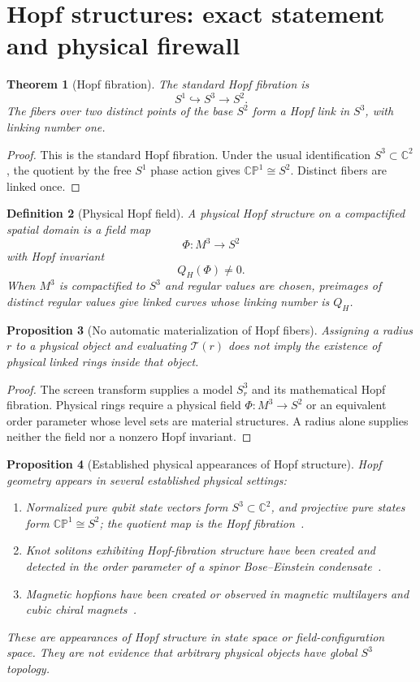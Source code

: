 \documentclass[11pt,a4paper]{article}
\newtheorem{theorem}{Theorem}[section]
\newtheorem{proposition}[theorem]{Proposition}
\newtheorem{definition}[theorem]{Definition}
\begin{document}
\section{Hopf structures: exact statement and physical firewall}
\label{sec:hopf-firewall}

\begin{theorem}[Hopf fibration]
The standard Hopf fibration is
\[
S^1\hookrightarrow S^3\to S^2.
\]
The fibers over two distinct points of the base $S^2$ form a Hopf link in $S^3$, with linking number one.
\end{theorem}
\begin{proof}
This is the standard Hopf fibration.  Under the usual identification $S^3\subset\mathbb C^2$, the quotient by the free $S^1$ phase action gives $\mathbb{CP}^1\cong S^2$.  Distinct fibers are linked once.
\end{proof}

\begin{definition}[Physical Hopf field]
A physical Hopf structure on a compactified spatial domain is a field map
\[
\Phi:M^3\to S^2
\]
with Hopf invariant
\[
Q_H(\Phi)\ne0.
\]
When $M^3$ is compactified to $S^3$ and regular values are chosen, preimages of distinct regular values give linked curves whose linking number is $Q_H$.
\end{definition}

\begin{proposition}[No automatic materialization of Hopf fibers]
Assigning a radius $r$ to a physical object and evaluating $\mathcal T(r)$ does not imply the existence of physical linked rings inside that object.
\end{proposition}
\begin{proof}
The screen transform supplies a model $S^3_r$ and its mathematical Hopf fibration.  Physical rings require a physical field $\Phi:M^3\to S^2$ or an equivalent order parameter whose level sets are material structures.  A radius alone supplies neither the field nor a nonzero Hopf invariant.
\end{proof}

\begin{proposition}[Established physical appearances of Hopf structure]
Hopf geometry appears in several established physical settings:
\begin{enumerate}
\item Normalized pure qubit state vectors form $S^3\subset\mathbb C^2$, and projective pure states form $\mathbb{CP}^1\cong S^2$; the quotient map is the Hopf fibration~\cite{Urbantke2003}.
\item Knot solitons exhibiting Hopf-fibration structure have been created and detected in the order parameter of a spinor Bose--Einstein condensate~\cite{Hall2016}.
\item Magnetic hopfions have been created or observed in magnetic multilayers and cubic chiral magnets~\cite{Kent2021,Zheng2023}.
\end{enumerate}
These are appearances of Hopf structure in state space or field-configuration space.  They are not evidence that arbitrary physical objects have global $S^3$ topology.
\end{proposition}
\end{document}
